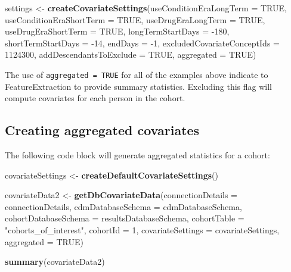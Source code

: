 \documentclass[11pt]{book}
\newenvironment{Shaded}{\begin{snugshade}}{\end{snugshade}}
\newcommand{\DataTypeTok}[1]{\textcolor[rgb]{0.13,0.29,0.53}{#1}}
\newcommand{\DecValTok}[1]{\textcolor[rgb]{0.00,0.00,0.81}{#1}}
\newcommand{\KeywordTok}[1]{\textcolor[rgb]{0.13,0.29,0.53}{\textbf{#1}}}
\newcommand{\NormalTok}[1]{#1}
\newcommand{\OtherTok}[1]{\textcolor[rgb]{0.56,0.35,0.01}{#1}}
\newcommand{\StringTok}[1]{\textcolor[rgb]{0.31,0.60,0.02}{#1}}
\theoremstyle{definition}
\theoremstyle{definition}
\theoremstyle{definition}
\theoremstyle{remark}
\let\BeginKnitrBlock\begin \let\EndKnitrBlock\end
\begin{document}
\begin{Shaded}
\begin{Highlighting}[]
\NormalTok{settings <-}\StringTok{ }\KeywordTok{createCovariateSettings}\NormalTok{(}\DataTypeTok{useConditionEraLongTerm =} \OtherTok{TRUE}\NormalTok{, }
                                    \DataTypeTok{useConditionEraShortTerm =} \OtherTok{TRUE}\NormalTok{, }
                                    \DataTypeTok{useDrugEraLongTerm =} \OtherTok{TRUE}\NormalTok{, }
                                    \DataTypeTok{useDrugEraShortTerm =} \OtherTok{TRUE}\NormalTok{, }
                                    \DataTypeTok{longTermStartDays =} \DecValTok{-180}\NormalTok{, }
                                    \DataTypeTok{shortTermStartDays =} \DecValTok{-14}\NormalTok{, }
                                    \DataTypeTok{endDays =} \DecValTok{-1}\NormalTok{, }
                                    \DataTypeTok{excludedCovariateConceptIds =} \DecValTok{1124300}\NormalTok{, }
                                    \DataTypeTok{addDescendantsToExclude =} \OtherTok{TRUE}\NormalTok{, }
                                    \DataTypeTok{aggregated =} \OtherTok{TRUE}\NormalTok{) }
\end{Highlighting}
\end{Shaded}

\BeginKnitrBlock{rmdimportant}
The use of \texttt{aggregated\ =\ TRUE} for all of the examples above indicate to FeatureExtraction to provide summary statistics. Excluding this flag will compute covariates for each person in the cohort.
\EndKnitrBlock{rmdimportant}

\hypertarget{creating-aggregated-covariates}{%
\subsection{Creating aggregated covariates}\label{creating-aggregated-covariates}}

The following code block will generate aggregated statistics for a cohort:

\begin{Shaded}
\begin{Highlighting}[]
\NormalTok{covariateSettings <-}\StringTok{ }\KeywordTok{createDefaultCovariateSettings}\NormalTok{() }

\NormalTok{covariateData2 <-}\StringTok{ }\KeywordTok{getDbCovariateData}\NormalTok{(}\DataTypeTok{connectionDetails =}\NormalTok{ connectionDetails, }
                                    \DataTypeTok{cdmDatabaseSchema =}\NormalTok{ cdmDatabaseSchema, }
                                    \DataTypeTok{cohortDatabaseSchema =}\NormalTok{ resultsDatabaseSchema, }
                                    \DataTypeTok{cohortTable =} \StringTok{"cohorts_of_interest"}\NormalTok{, }
                                    \DataTypeTok{cohortId =} \DecValTok{1}\NormalTok{, }
                                    \DataTypeTok{covariateSettings =}\NormalTok{ covariateSettings, }
                                    \DataTypeTok{aggregated =} \OtherTok{TRUE}\NormalTok{) }

\KeywordTok{summary}\NormalTok{(covariateData2) }
\end{Highlighting}
\end{Shaded}
\end{document}
